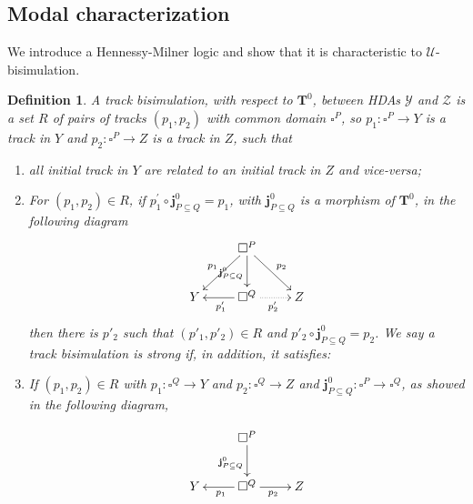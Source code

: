 \documentclass[11pt,a4paper,oldfontcommands]{memoir}
\newcommand{\TrO}{\mathbf{T}}
\newcommand*\jneda{\mathbf{j}}
\newtheorem{definition}{Definition}
\begin{document}
\subsection{Modal characterization}
We introduce a Hennessy-Milner logic and show that it is characteristic to $\mathcal{U}$-bisimulation.

        \begin{definition}\label{def: track bisimulation}
     A track bisimulation, with respect to $\TrO^0$, between HDAs $\mathcal{Y}$ and $\mathcal{Z}$ is a set $R$ of pairs of tracks $\left(p_{1}, p_{2}\right)$ with common domain $\square^P$, so $p_{1}: \square^P \rightarrow Y$ is a track in $Y$ and $p_{2}: \square^P \rightarrow Z$ is a track in $Z$, such that
\begin{enumerate}
    \item \label{eq1: track bis} all initial track in $Y$ are related to an initial track in $Z$ and vice-versa;
    \item \label{eq2: track bis} For $\left(p_{1}, p_{2}\right) \in R$, if $p_{1}^{\prime} \circ \jneda^0_{P \subseteq Q}=p_{1}$, with $\jneda^0_{P \subseteq Q}$ is a morphism of $\TrO^0$, in the following diagram
$$\xymatrix{
     &    \square^P \ar[dl]_{p_1} \ar[d]_{\jneda^0_{P \subseteq Q}} \ar[dr]^{p_2}   \\
   Y & \square^Q \ar[l]^{p'_1 } \ar@{.>}[r]_{p'_2} &  Z                          }
$$
then there is $p'_2$ such that $(p'_1,p'_2) \in R$ and $p'_2 \circ\jneda^0_{P \subseteq Q}=p_2$. %
We say a track bisimulation is strong if, in addition, it satisfies:
\item \label{eq3: track bis}  If $(p_1,p_2) \in R$ with $p_{1}: \square^Q \rightarrow Y$ and $p_{2}: \square^Q \rightarrow Z$ and $\jneda^0_{P \subseteq Q}: \square^P \rightarrow \square^Q$, as showed in the following diagram,

$$\xymatrix{
     &    \square^P  \ar[d]_{\jneda^0_{P \subseteq Q}}  \\
   Y & \square^Q \ar[l]^{p_1 } \ar[r]_{p_2} &  Z                          }
$$


\end{enumerate}
\end{definition}
\end{document}
